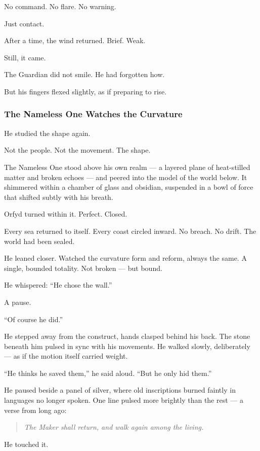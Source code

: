 \documentclass[12pt]{article}
\begin{document}
No command. No flare. No warning.

Just contact.

After a time, the wind returned. Brief. Weak.

Still, it came.

The Guardian did not smile. He had forgotten how.

But his fingers flexed slightly, as if preparing to rise.

\dotfill

\subsubsection*{The Nameless One Watches the Curvature}

He studied the shape again.

Not the people. Not the movement. The shape.

The Nameless One stood above his own realm — a layered plane of heat-stilled matter and broken echoes — and peered into the model of the world below. It shimmered within a chamber of glass and obsidian, suspended in a bowl of force that shifted subtly with his breath.

Orfyd turned within it. Perfect. Closed.

Every sea returned to itself. Every coast circled inward. No breach. No drift. The world had been sealed.

He leaned closer. Watched the curvature form and reform, always the same. A single, bounded totality. Not broken — but bound.

He whispered: ``He chose the wall.''

A pause.

``Of course he did.''

He stepped away from the construct, hands clasped behind his back. The stone beneath him pulsed in sync with his movements. He walked slowly, deliberately — as if the motion itself carried weight.

``He thinks he saved them,'' he said aloud. ``But he only hid them.''

He paused beside a panel of silver, where old inscriptions burned faintly in languages no longer spoken. One line pulsed more brightly than the rest — a verse from long ago:

\begin{quote}
\emph{The Maker shall return, and walk again among the living.}
\end{quote}

He touched it.
\end{document}
